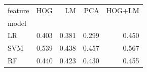 \begin{tabular}{lrrrr}
\toprule
feature & HOG & LM & PCA & HOG+LM \\
model &  &  &  &  \\
\midrule
LR & 0.403 & 0.381 & 0.299 & 0.450 \\
SVM & 0.539 & 0.438 & 0.457 & 0.567 \\
RF & 0.440 & 0.423 & 0.430 & 0.455 \\
\bottomrule
\end{tabular}
